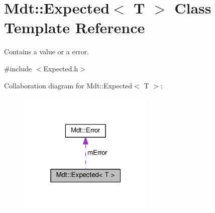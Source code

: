 \hypertarget{class_mdt_1_1_expected}{}\section{Mdt\+:\+:Expected$<$ T $>$ Class Template Reference}
\label{class_mdt_1_1_expected}


Contains a value or a error.  




{\ttfamily \#include $<$Expected.\+h$>$}



Collaboration diagram for Mdt\+:\+:Expected$<$ T $>$\+:
\nopagebreak
\begin{figure}[H]
\begin{center}
\leavevmode
\includegraphics[width=184pt]{class_mdt_1_1_expected__coll__graph}
\end{center}
\end{figure}
